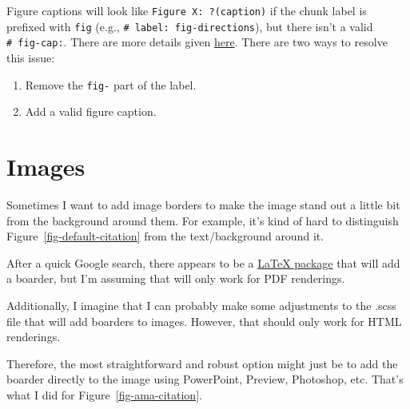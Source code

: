 \documentclass[
  letterpaper,
  DIV=11,
  numbers=noendperiod]{scrreprt}
\providecommand{\tightlist}{%
  \setlength{\itemsep}{0pt}\setlength{\parskip}{0pt}}\usepackage{longtable,booktabs,array}
\begin{document}
\begin{tcolorbox}[enhanced jigsaw, breakable, title=\textcolor{quarto-callout-warning-color}{\faExclamationTriangle}\hspace{0.5em}{Creating figures without captions}, bottomrule=.15mm, coltitle=black, left=2mm, colbacktitle=quarto-callout-warning-color!10!white, colback=white, toprule=.15mm, leftrule=.75mm, arc=.35mm, colframe=quarto-callout-warning-color-frame, bottomtitle=1mm, toptitle=1mm, opacityback=0, titlerule=0mm, opacitybacktitle=0.6, rightrule=.15mm]

Figure captions will look like \texttt{Figure\ X:\ ?(caption)} if the
chunk label is prefixed with \texttt{fig} (e.g.,
\texttt{\#\textbar{}\ label:\ fig-directions}), but there isn't a valid
\texttt{\#\textbar{}\ fig-cap:}. There are more details given
\href{https://github.com/quarto-dev/quarto-cli/issues/3878}{here}. There
are two ways to resolve this issue:

\begin{enumerate}
\def\labelenumi{\arabic{enumi}.}
\tightlist
\item
  Remove the \texttt{fig-} part of the label.
\item
  Add a valid figure caption.
\end{enumerate}

\end{tcolorbox}

\section{Images}\label{images}

Sometimes I want to add image borders to make the image stand out a
little bit from the background around them. For example, it's kind of
hard to distinguish Figure~\ref{fig-default-citation} from the
text/background around it.

After a quick Google search, there appears to be a
\href{https://quarto.org/docs/authoring/figures.html\#environments}{LaTeX
package} that will add a boarder, but I'm assuming that will only work
for PDF renderings.

Additionally, I imagine that I can probably make some adjustments to the
.scss file that will add boarders to images. However, that should only
work for HTML renderings.

Therefore, the most straightforward and robust option might just be to
add the boarder directly to the image using PowerPoint, Preview,
Photoshop, etc. That's what I did for Figure~\ref{fig-ama-citation}.
\end{document}

